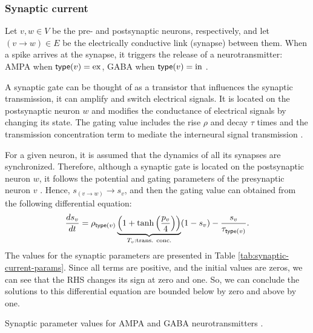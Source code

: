 \subsubsection{Synaptic current}

Let $v, w \in V$ be the pre- and postsynaptic neurons, respectively, and let $(v \to w) \in E$ be the electrically conductive link (synapse) between them. When a spike arrives at the synapse, it triggers the release of a neurotransmitter: AMPA when $\mathsf{type}(v) = \mathrm{ex}$, GABA when $\mathsf{type}(v) = \mathrm{in}$ \cite{Lowet2015}.


A synaptic gate can be thought of as a transistor that influences the synaptic transmission, it can amplify and switch electrical signals. It is located on the postsynaptic neuron $w$ and modifies the conductance of electrical signals by changing its state. The gating value includes the rise $\rho$ and decay $\tau$ times and the transmission concentration term to mediate the interneural signal transmission \cite{Destexhe1994}.

For a given neuron, it is assumed that the dynamics of all its synapses are synchronized. Therefore, although a synaptic gate is located on the postsynaptic neuron $w$, it follows the potential and gating parameters of the presynaptic neuron $v$ \cite{Lowet2015}. Hence, $s_{(v \to w)} \to s_v$, and then the gating value can obtained from the following differential equation:
\begin{equation}
    \frac{ds_v}{dt} = \rho_{\mathsf{type}(v)} \underbrace{\left( 1 + \tanh \left( \frac{p_{v}}{4} \right) \right)}_{T_v: \text{trans. conc.}} (1 - s_v) - \frac{s_v}{\tau_{\mathsf{type}(v)}}.
    \label{eq:synaptic-gates}\end{equation}
The values for the synaptic parameters are presented in Table \ref{tab:synaptic-current-params}.
Since all terms are positive, and the initial values are zeros, we can see that the RHS changes its sign at zero and one. So, we can conclude the solutions to this differential equation are bounded below by zero and above by one.

\begin{table}[!htp] 
    \centering
    
    \caption[Synaptic parameter values]{Synaptic parameter values for AMPA and GABA neurotransmitters \cite{Lowet2015}.}
    \label{tab:synaptic-current-params}
\end{table}


